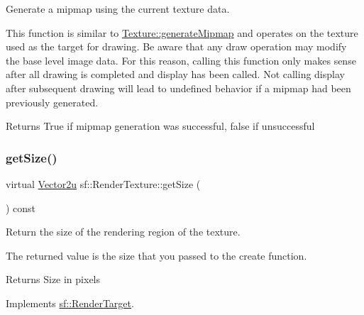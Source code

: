 Generate a mipmap using the current texture data. 

This function is similar to \hyperlink{classsf_1_1_texture_a7779a75c0324b5faff77602f871710a9}{Texture\+::generate\+Mipmap} and operates on the texture used as the target for drawing. Be aware that any draw operation may modify the base level image data. For this reason, calling this function only makes sense after all drawing is completed and display has been called. Not calling display after subsequent drawing will lead to undefined behavior if a mipmap had been previously generated.

\begin{DoxyReturn}{Returns}
True if mipmap generation was successful, false if unsuccessful 
\end{DoxyReturn}
\mbox{\label{classsf_1_1_render_texture_a6685315b5c4c25a5dcb75b4280b381ba}} 
\subsubsection{\texorpdfstring{get\+Size()}{getSize()}}
{\footnotesize\ttfamily virtual \hyperlink{classsf_1_1_vector2}{Vector2u} sf\+::\+Render\+Texture\+::get\+Size (\begin{DoxyParamCaption}{ }\end{DoxyParamCaption}) const\hspace{0.3cm}{\ttfamily [virtual]}}



Return the size of the rendering region of the texture. 

The returned value is the size that you passed to the create function.

\begin{DoxyReturn}{Returns}
Size in pixels 
\end{DoxyReturn}


Implements \hyperlink{classsf_1_1_render_target_a2e5ade2457d9fb4c4907ae5b3d9e94a5}{sf\+::\+Render\+Target}.

\mbox{\label{classsf_1_1_render_texture_a07ecea85f05932fa02a8279416721bc9}} 
